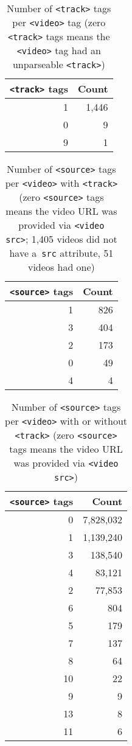 \documentclass{sig-alternate-ceur}
\begin{document}
\begin{table}[b!]
  \raggedleft
  \footnotesize  
  \begin{tabular}{ r | r }                       
    \texttt{<track>} tags & Count \\
    \hline
    1 & 1,446\\
    0 & 9\\
    9 & 1\\
  \end{tabular}
  \caption{Number of \texttt{<track>} tags per
    \texttt{<video>} tag \tiny (zero \texttt{<track>}
    tags means  the \texttt{<video>} tag had
    an  unparseable \texttt{<track>})}
  \label{table:track}    
\end{table}

\begin{table}[t!]
  \raggedleft
  \footnotesize  
  \begin{tabular}{ r | r }
    \texttt{<source>} tags & Count \\
    \hline
    1 & 826\\    
    3 & 404\\    
    2 & 173\\    
    0 & 49\\
    4 & 4\\
  \end{tabular}
  \caption{Number of \texttt{<source>} tags per
    \texttt{<video>} with \texttt{<track>} \tiny (zero \texttt{<source>}
    tags means the video URL was provided via
    \texttt{<video src>}; 1,405 videos did not have
    a~\texttt{src} attribute, 51 videos had one)}
  \label{table:source}    
\end{table}

\begin{table}[t!]
  \raggedleft
  \footnotesize  
  \begin{tabular}{ r | r }
    \texttt{<source>} tags & Count \\
    \hline
    0 & 7,828,032\\
    1 & 1,139,240\\
    3 & 138,540\\
    4 & 83,121\\    
    2 & 77,853\\
    6 & 804\\    
    5 & 179\\
    7 & 137\\
    8 & 64\\
    10 & 22\\    
    9 & 9\\
    13 & 8\\
    11 & 6\\
  \end{tabular}
  \caption{Number of \texttt{<source>} tags per
    \texttt{<video>} with or without \texttt{<track>}
    \tiny (zero \texttt{<source>}
    tags means the video URL was provided via
    \texttt{<video src>})}
  \label{table:sourceFull}    
\end{table}
\end{document}
